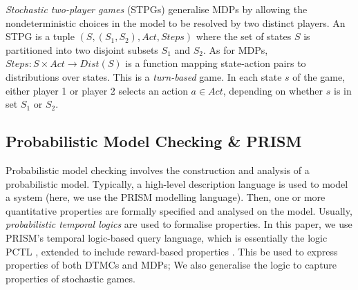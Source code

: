 \documentclass{llncs}
\begin{document}
\emph{Stochastic two-player games} (STPGs) generalise MDPs by allowing the nondeterministic choices
in the model to be resolved by two distinct players.
An STPG is a tuple $(S,(S_1,S_2),Act,Steps)$
where the set of states $S$ is partitioned into two disjoint subsets $S_1$ and $S_2$.
As for MDPs, $Steps:S\times Act\rightarrow Dist(S)$ is a function mapping
state-action pairs to distributions over states.
This is a \emph{turn-based} game. In each state $s$ of the game,
either player 1 or player 2 selects an action $a\in Act$,
depending on whether $s$ is in set $S_1$ or $S_2$.
\vspace{-10pt}
\subsection{Probabilistic Model Checking \& PRISM}

Probabilistic model checking involves the construction and analysis of a probabilistic model.
Typically, a high-level description language is used to model a system
(here, we use the PRISM \cite{KNP11} modelling language).
Then, one or more quantitative properties are formally specified and analysed on the model.
Usually, \emph{probabilistic temporal logics} are used to formalise properties.
In this paper, we use PRISM's temporal logic-based query language,
which is essentially the logic PCTL \cite{HJ94},
extended to include reward-based properties \cite{KNP07a,FKNP11}.
This be used to express properties of both DTMCs and MDPs;
We also generalise the logic to capture properties of stochastic games.
\end{document}
